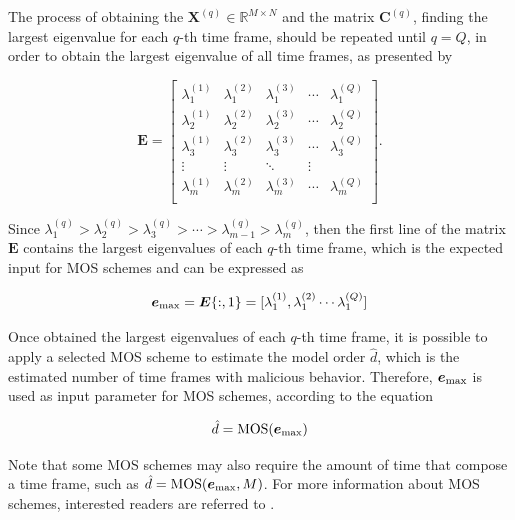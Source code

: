 \documentclass[twocolumn]{svjour3}          	%
\begin{document}
The process of obtaining the $\mathbf{X}^{(q)} \in \mathbb{R}^{M\times{N}}$ and the matrix $\mathbf{C}^{(q)}$, finding the largest eigenvalue for each $q$-th time frame, should be repeated until $q = Q$, in order to obtain the largest eigenvalue of all time frames, as presented by 

\begin{equation}\label{eq:eq08}
\mathbf{E} =
\begin{bmatrix}
  \lambda_1^{(1)} & \lambda_1^{(2)} & \lambda_1^{(3)} & \cdots & \lambda_1^{(Q)} \\
  \lambda_2^{(1)} & \lambda_2^{(2)} & \lambda_2^{(3)} & \cdots & \lambda_2^{(Q)} \\
  \lambda_3^{(1)} & \lambda_3^{(2)} & \lambda_3^{(3)} & \cdots & \lambda_3^{(Q)} \\
  \vdots & \vdots & \ddots & \vdots  \\
  \lambda_m^{(1)} & \lambda_m^{(2)} & \lambda_m^{(3)} & \cdots & \lambda_m^{(Q)} \\
\end{bmatrix}.
\end{equation}

Since $\lambda_1^{(q)} > \lambda_2^{(q)} > \lambda_3^{(q)} > \cdots > \lambda_{m-1}^{(q)} > \lambda_m^{(q)}$, then the first line of the matrix $\mathbf{E}$ contains the largest eigenvalues of each $q$-th time frame, which is the expected input for MOS schemes and can be expressed as 

\begin{equation}\label{eq:eq09}
\boldsymbol{e}_{\rm max} = \boldsymbol{E}\{:,1\} = [ \lambda_1^{(1)}, \lambda_1^{(2)} \cdots \lambda_1^{(Q)}]
\end{equation}

Once obtained the largest eigenvalues of each $q$-th time frame, it is possible to apply a selected MOS scheme to estimate the model order $\hat{d}$, which is the estimated number of time frames with malicious behavior. Therefore, $\boldsymbol{e}_{\rm max}$ is used as input parameter for MOS schemes, according to the equation

\begin{equation}\label{eq:eq09}
\hat{d} = \textrm{MOS}(\boldsymbol{e}_{\rm max})
\end{equation}

Note that some MOS schemes may also require the amount of time that compose a time frame, such as $\hat{d} = \textrm{MOS}(\boldsymbol{e}_{\rm max}, M)$. For more information about MOS schemes, interested readers are referred to \cite{da2009comparison}.
\end{document}
